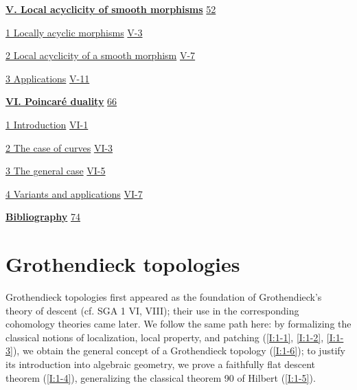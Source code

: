 \hyperref[I:5]{\textbf{V. Local acyclicity of smooth morphisms}}\dotfill
  \hyperref[I:5]{52}\par
\hspace*{1.5em}\hyperref[I:5-1]{1 Locally acyclic morphisms}\dotfill
  \hyperref[I:5-1]{V-3}\par
\hspace*{1.5em}\hyperref[I:5-2]{2 Local acyclicity of a smooth morphism}\dotfill
  \hyperref[I:5-2]{V-7}\par
\hspace*{1.5em}\hyperref[I:5-3]{3 Applications}\dotfill
  \hyperref[I:5-3]{V-11}\par

\hyperref[I:6]{\textbf{VI. Poincaré duality}}\dotfill
  \hyperref[I:6]{66}\par
\hspace*{1.5em}\hyperref[I:6-1]{1 Introduction}\dotfill
  \hyperref[I:6-1]{VI-1}\par
\hspace*{1.5em}\hyperref[I:6-2]{2 The case of curves}\dotfill
  \hyperref[I:6-2]{VI-3}\par
\hspace*{1.5em}\hyperref[I:6-3]{3 The general case}\dotfill
  \hyperref[I:6-3]{VI-5}\par
\hspace*{1.5em}\hyperref[I:6-4]{4 Variants and applications}\dotfill
  \hyperref[I:6-4]{VI-7}\par

\hyperref[I:bib]{\textbf{Bibliography}}\dotfill
  \hyperref[I:bib]{74}\par
\endgroup

\newpage

\section{Grothendieck topologies}\label{I:1}

Grothendieck topologies first appeared as the foundation of Grothendieck's
theory of descent (cf. SGA 1 VI, VIII); their use in the corresponding
cohomology theories came later. We follow the same path here: by formalizing
the classical notions of localization, local property, and patching
(\ref{I:1-1}, \ref{I:1-2}, \ref{I:1-3}), we obtain the general concept of a
Grothendieck topology (\ref{I:1-6}); to justify its introduction into
algebraic geometry, we prove a faithfully flat descent theorem
(\ref{I:1-4}), generalizing the classical theorem 90 of Hilbert
(\ref{I:1-5}).

